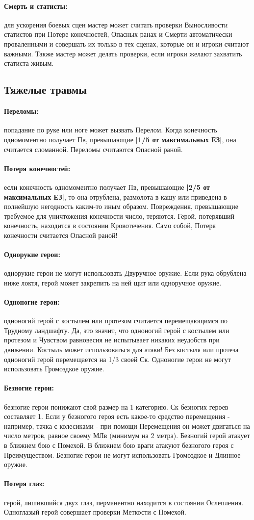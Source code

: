\paragraph{Смерть и статисты:} для ускорения боевых сцен мастер может считать проверки Выносливости статистов при Потере конечностей, Опасных ранах и Смерти автоматически проваленными и совершать их только в тех сценах, которые он и игроки считают важными. Также мастер может делать проверки, если игроки желают захватить статиста живым.
\subsection{Тяжелые травмы}
\paragraph{Переломы:} попадание по руке или ноге может вызвать Перелом. Когда конечность одномоментно получает Пв, превышающие \textbf{|1/5 от максимальных ЕЗ|}, она считается сломанной. Переломы считаются Опасной раной.
\paragraph{Потеря конечностей:} если конечность одномоментно получает Пв, превышающие \textbf{|2/5 от максимальных ЕЗ|}, то она отрублена, размолота в кашу или приведена в полнейшую негодность каким-то иным образом. Повреждения, превышающие требуемое для уничтожения конечности число, теряются. Герой, потерявший конечность, находится в состоянии Кровотечения. Само собой, Потеря конечности считается Опасной раной!
\paragraph{Однорукие герои:} однорукие герои не могут использовать Двуручное оружие. Если рука обрублена ниже локтя, герой может закрепить на ней щит или одноручное оружие.
\paragraph{Одноногие герои:} одноногий герой с костылем или протезом считается перемещающимся по Трудному ландшафту. Да, это значит, что одноногий герой с костылем или протезом и Чувством равновесия не испытывает никаких неудобств при движении. Костыль может использоваться для атаки! Без костыля или протеза одноногий герой перемещается на 1/3 своей Ск. Одноногие герои не могут использовать Громоздкое оружие.
\paragraph{Безногие герои:} безногие герои понижают свой размер на 1 категорию. Ск безногих героев составляет 1. Если у безногого героя есть какое-то средство перемещения - например, тачка с колесиками - при помощи Перемещения он может двигаться на число метров, равное своему МЛв (минимум на 2 метра). Безногий герой атакует в ближнем бою с Помехой. В ближнем бою враги атакуют безногого героя с Преимуществом. Безногие герои не могут использовать Громоздкое и Длинное оружие.
\paragraph{Потеря глаз:} герой, лишившийся двух глаз, перманентно находится в состоянии Ослепления. Одноглазый герой совершает проверки Меткости с Помехой.